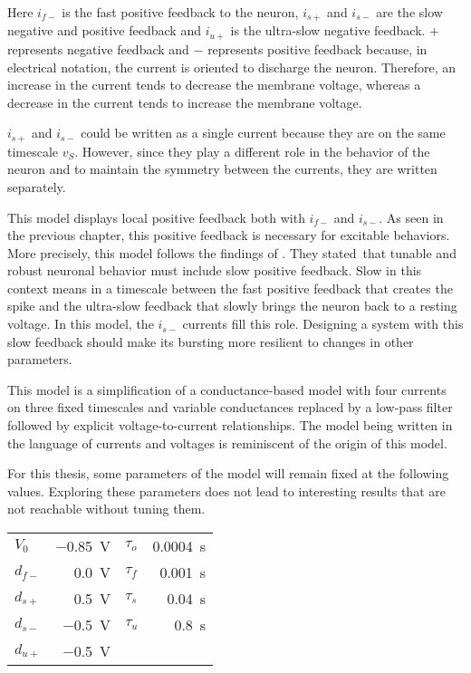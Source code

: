 Here $i_{f-}$ is the fast positive feedback to the neuron, $i_{s+}$ and $i_{s-}$ are the slow negative and positive feedback and $i_{u+}$ is the ultra-slow negative feedback. $+$ represents negative feedback and $-$ represents positive feedback because, in electrical notation, the current is oriented to discharge the neuron. Therefore, an increase in the current tends to decrease the membrane voltage, whereas a decrease in the current tends to increase the membrane voltage.

$i_{s+}$ and $i_{s-}$ could be written as a single current because they are on the same timescale $v_S$.
However, since they play a different role in the behavior of the neuron and to maintain the symmetry between the currents, they are written separately.

This model displays local positive feedback both with $i_{f-}$ and $i_{s-}$.
As seen in the previous chapter, this positive feedback is necessary for excitable behaviors.
More precisely, this model follows the findings of \citet{burstingSlowFeedback}.
They stated that tunable and robust neuronal behavior must include slow positive feedback.
Slow in this context means in a timescale between the fast positive feedback that creates the spike and the ultra-slow feedback that slowly brings the neuron back to a resting voltage.
In this model, the $i_{s-}$ currents fill this role.
Designing a system with this slow feedback should make its bursting more resilient to changes in other parameters.

This model is a simplification of a conductance-based model with four currents on three fixed timescales and variable conductances replaced by a low-pass filter followed by explicit voltage-to-current relationships.
The model being written in the language of currents and voltages is reminiscent of the origin of this model.

For this thesis, some parameters of the model will remain fixed at the following values. Exploring these parameters does not lead to interesting results that are not reachable without tuning them. 
{

\large\centering
\begin{tabular}{lr|lr}
    $V_0$    & \qty{-0.85}{\volt} & $\tau_{o}$ & \qty{0.0004}{\second}\\
    $d_{f-}$ & \qty{0.0}{\volt}   & $\tau_{f}$ & \qty{0.001}{\second}\\
    $d_{s+}$ & \qty{0.5}{\volt}   & $\tau_{s}$ & \qty{0.04}{\second}\\
    $d_{s-}$ & \qty{-0.5}{\volt}  & $\tau_{u}$ & \qty{0.8}{\second}\\
    $d_{u+}$ & \qty{-0.5}{\volt}  & &
\end{tabular}

}

